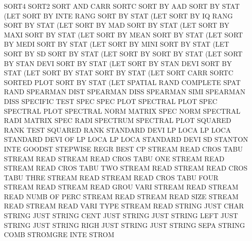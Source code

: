 SORT4                                   SORT2
SORT     AND  CARR                      SORTC
SORT     BY   AAD                       SORT     BY   STAT (LET
SORT     BY   INTE RANG                 SORT     BY   STAT (LET
SORT     BY   IQ   RANG                 SORT     BY   STAT (LET
SORT     BY   MAD                       SORT     BY   STAT (LET
SORT     BY   MAXI                      SORT     BY   STAT (LET
SORT     BY   MEAN                      SORT     BY   STAT (LET
SORT     BY   MEDI                      SORT     BY   STAT (LET
SORT     BY   MINI                      SORT     BY   STAT (LET
SORT     BY   SD                        SORT     BY   STAT (LET
SORT     BY                             SORT     BY   STAT (LET
SORT     BY   STAN DEVI                 SORT     BY   STAT (LET
SORT     BY   STAN DEVI                 SORT     BY   STAT (LET
SORT     BY   STAT                      SORT     BY   STAT (LET
SORT     CARR                           SORTC
SORTED   PLOT                           SORT     BY   STAT (LET
SPATIAL  RAND                           COMPLETE SPAT RAND
SPEARMAN DIST                           SPEARMAN DISS
SPEARMAN SIMI                           SPEARMAN DISS
SPECIFIC                                TEST     SPEC
SPEC     PLOT                           SPECTRAL PLOT
SPEC                                    SPECTRAL PLOT
SPECTRAL NORM                           MATRIX   SPEC NORM
SPECTRAL RADI                           MATRIX   SPEC RADI
SPECTRUM                                SPECTRAL PLOT
SQUARED  RANK TEST                      SQUARED  RANK
STANDARD DEVI LP   LOCA                 LP       LOCA
STANDARD DEVI OF   LP   LOCA            LP       LOCA
STANDARD DEVI                           SD
STANTON  INTE                           GOODST
STEPWISE REGR                           BEST     CP
STREAM   READ CROS TABU                 STREAM   READ
STREAM   READ CROS TABU ONE             STREAM   READ
STREAM   READ CROS TABU TWO             STREAM   READ
STREAM   READ CROS TABU THRE            STREAM   READ
STREAM   READ CROS TABU FOUR            STREAM   READ
STREAM   READ GROU VARI                 STREAM   READ
STREAM   READ NUMB OF   PERC            STREAM   READ
STREAM   READ SIZE                      STREAM   READ
STREAM   READ VARI TYPE                 STREAM   READ
STRING   JUST CHAR                      STRING   JUST
STRING   CENT JUST                      STRING   JUST
STRING   LEFT JUST                      STRING   JUST
STRING   RIGH JUST                      STRING   JUST
STRING   SEPA                           STRING   COMB
STROMGRE INTE                           STROM
